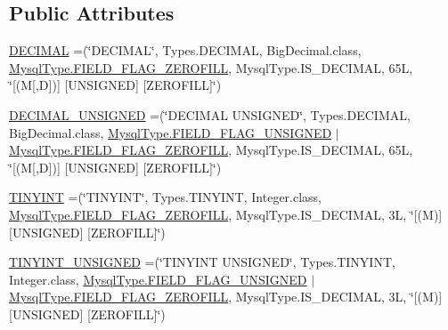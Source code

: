 \subsection*{Public Attributes}
\begin{DoxyCompactItemize}
\item 
\mbox{\hyperlink{enumcom_1_1mysql_1_1cj_1_1_mysql_type_a90f5401b1fa7f31d2d384156fa552e2c}{D\+E\+C\+I\+M\+AL}} =(\char`\"{}D\+E\+C\+I\+M\+AL\char`\"{}, Types.\+D\+E\+C\+I\+M\+AL, Big\+Decimal.\+class, \mbox{\hyperlink{enumcom_1_1mysql_1_1cj_1_1_mysql_type_abb76a1f2f3dac9a30d1b559b8ba66a48}{Mysql\+Type.\+F\+I\+E\+L\+D\+\_\+\+F\+L\+A\+G\+\_\+\+Z\+E\+R\+O\+F\+I\+LL}}, Mysql\+Type.\+I\+S\+\_\+\+D\+E\+C\+I\+M\+AL, 65\+L, \char`\"{}\mbox{[}(\+M\mbox{[},\+D\mbox{]})\mbox{]} \mbox{[}\+U\+N\+S\+I\+G\+N\+E\+D\mbox{]} \mbox{[}\+Z\+E\+R\+O\+F\+I\+L\+L\mbox{]}\char`\"{})
\item 
\mbox{\hyperlink{enumcom_1_1mysql_1_1cj_1_1_mysql_type_acf73450623fafadf72095ff8bcab078e}{D\+E\+C\+I\+M\+A\+L\+\_\+\+U\+N\+S\+I\+G\+N\+ED}} =(\char`\"{}D\+E\+C\+I\+M\+AL U\+N\+S\+I\+G\+N\+ED\char`\"{}, Types.\+D\+E\+C\+I\+M\+AL, Big\+Decimal.\+class, \mbox{\hyperlink{enumcom_1_1mysql_1_1cj_1_1_mysql_type_a2c6701614559b1ad9955cdc4ca6337e2}{Mysql\+Type.\+F\+I\+E\+L\+D\+\_\+\+F\+L\+A\+G\+\_\+\+U\+N\+S\+I\+G\+N\+ED}} $\vert$ \mbox{\hyperlink{enumcom_1_1mysql_1_1cj_1_1_mysql_type_abb76a1f2f3dac9a30d1b559b8ba66a48}{Mysql\+Type.\+F\+I\+E\+L\+D\+\_\+\+F\+L\+A\+G\+\_\+\+Z\+E\+R\+O\+F\+I\+LL}}, Mysql\+Type.\+I\+S\+\_\+\+D\+E\+C\+I\+M\+AL, 65\+L, \char`\"{}\mbox{[}(\+M\mbox{[},\+D\mbox{]})\mbox{]} \mbox{[}\+U\+N\+S\+I\+G\+N\+E\+D\mbox{]} \mbox{[}\+Z\+E\+R\+O\+F\+I\+L\+L\mbox{]}\char`\"{})
\item 
\mbox{\hyperlink{enumcom_1_1mysql_1_1cj_1_1_mysql_type_a87adada40b706dcea9427e4cf5294ed8}{T\+I\+N\+Y\+I\+NT}} =(\char`\"{}T\+I\+N\+Y\+I\+NT\char`\"{}, Types.\+T\+I\+N\+Y\+I\+NT, Integer.\+class, \mbox{\hyperlink{enumcom_1_1mysql_1_1cj_1_1_mysql_type_abb76a1f2f3dac9a30d1b559b8ba66a48}{Mysql\+Type.\+F\+I\+E\+L\+D\+\_\+\+F\+L\+A\+G\+\_\+\+Z\+E\+R\+O\+F\+I\+LL}}, Mysql\+Type.\+I\+S\+\_\+\+D\+E\+C\+I\+M\+AL, 3\+L, \char`\"{}\mbox{[}(\+M)\mbox{]} \mbox{[}\+U\+N\+S\+I\+G\+N\+E\+D\mbox{]} \mbox{[}\+Z\+E\+R\+O\+F\+I\+L\+L\mbox{]}\char`\"{})
\item 
\mbox{\hyperlink{enumcom_1_1mysql_1_1cj_1_1_mysql_type_a1c7d8b3f1301ee4a89e044bb753725ba}{T\+I\+N\+Y\+I\+N\+T\+\_\+\+U\+N\+S\+I\+G\+N\+ED}} =(\char`\"{}T\+I\+N\+Y\+I\+NT U\+N\+S\+I\+G\+N\+ED\char`\"{}, Types.\+T\+I\+N\+Y\+I\+NT, Integer.\+class, \mbox{\hyperlink{enumcom_1_1mysql_1_1cj_1_1_mysql_type_a2c6701614559b1ad9955cdc4ca6337e2}{Mysql\+Type.\+F\+I\+E\+L\+D\+\_\+\+F\+L\+A\+G\+\_\+\+U\+N\+S\+I\+G\+N\+ED}} $\vert$ \mbox{\hyperlink{enumcom_1_1mysql_1_1cj_1_1_mysql_type_abb76a1f2f3dac9a30d1b559b8ba66a48}{Mysql\+Type.\+F\+I\+E\+L\+D\+\_\+\+F\+L\+A\+G\+\_\+\+Z\+E\+R\+O\+F\+I\+LL}}, Mysql\+Type.\+I\+S\+\_\+\+D\+E\+C\+I\+M\+AL, 3\+L, \char`\"{}\mbox{[}(\+M)\mbox{]} \mbox{[}\+U\+N\+S\+I\+G\+N\+E\+D\mbox{]} \mbox{[}\+Z\+E\+R\+O\+F\+I\+L\+L\mbox{]}\char`\"{})

\end{DoxyCompactItemize}
